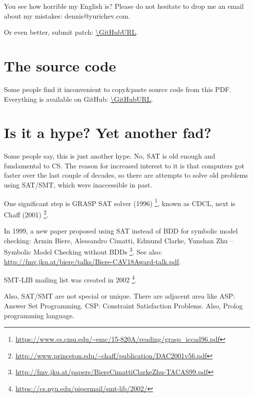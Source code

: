 You see how horrible my English is?
Please do not hesitate to drop me an email about my mistakes:
dennis@yurichev.com.

Or even better, submit patch: \url{\GitHubURL}.

\iffalse
\section{Illustrator wanted}

... who can draw in the following manner:
\href{https://github.com/DennisYurichev/RE-for-beginners/blob/master/cover.jpg}{1},
\href{https://github.com/DennisYurichev/RE-for-beginners/blob/master/cover2.jpg}{2},
\href{https://github.com/DennisYurichev/RE-for-beginners/blob/master/cover3.jpg}{3},
\href{https://github.com/DennisYurichev/RE-for-beginners/blob/master/cover4.jpg}{4}.

... for this book, which is open-source and free, and unlikely to be published.
However, someone maybe interested, in a self-advertisement sense...

Please contact me: dennis@yurichev.com.
\fi

\section{The source code}

Some people find it inconvenient to copy\&paste source code from this PDF.
Everything is available on GitHub: \url{\GitHubURL}.

\section{Is it a hype? Yet another fad?}

Some people say, this is just another hype.
No, \ac{SAT} is old enough and fundamental to \ac{CS}.
The reason for increased interest to it is that computers got faster over the last couple of decades,
so there are attempts to solve old problems using \ac{SAT}/\ac{SMT}, which were inaccessible in past.

One significant step is GRASP SAT solver (1996)
\footnote{\url{https://www.cs.cmu.edu/~emc/15-820A/reading/grasp_iccad96.pdf}}, known as \ac{CDCL},
next is Chaff (2001)
\footnote{\url{http://www.princeton.edu/~chaff/publication/DAC2001v56.pdf}}.

In 1999, a new paper proposed using SAT instead of BDD for symbolic model checking:
Armin Biere, Alessandro Cimatti, Edmund Clarke, Yunshan Zhu -- Symbolic Model Checking without BDDs
\footnote{\url{http://fmv.jku.at/papers/BiereCimattiClarkeZhu-TACAS99.pdf}}.
See also: \url{http://fmv.jku.at/biere/talks/Biere-CAV18Award-talk.pdf}.

SMT-LIB mailing list was created in 2002
\footnote{\url{https://cs.nyu.edu/pipermail/smt-lib/2002/}}.

Also, SAT/SMT are not special or unique.
There are adjacent area like ASP: Answer Set Programming.
CSP: Constraint Satisfaction Problems.
Also, Prolog programming language.


